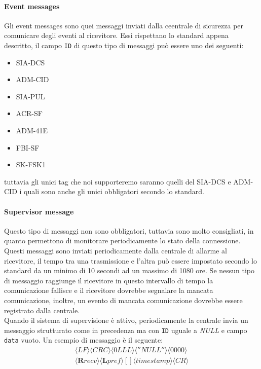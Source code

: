 \paragraph{Event messages}
Gli event messages sono quei messaggi inviati dalla ceentrale di sicurezza per comunicare degli eventi al ricevitore. Essi rispettano lo standard appena descritto, il campo \texttt{ID} di questo tipo di messaggi può essere uno dei seguenti:
\begin{itemize}
	\item SIA-DCS
	\item ADM-CID
	\item SIA-PUL
	\item ACR-SF
	\item ADM-41E
	\item FBI-SF
	\item SK-FSK1
\end{itemize}
tuttavia gli unici tag che noi supporteremo saranno quelli del SIA-DCS e ADM-CID i quali sono anche gli unici obbligatori secondo lo standard.
\paragraph{Supervisor message}
Questo tipo di messaggi non sono obbligatori, tuttavia sono molto consigliati, in quanto permettono di monitorare periodicamente lo stato della connessione. Questi messaggi sono inviati periodicamente dalla centrale di allarme al ricevitore, il tempo tra una trasmissione e l'altra può essere impostato secondo lo standard da un minimo di 10 secondi ad un massimo di 1080 ore. Se nessun tipo di messaggio raggiunge il ricevitore in questo intervallo di tempo la comunicazione fallisce e il ricevitore dovrebbe segnalare la mancata comunicazione, inoltre, un evento di mancata comunicazione dovrebbe essere registrato dalla centrale.\\
Quando il sistema di supervisione è attivo, periodicamente la centrale invia un messaggio strutturato come in precedenza ma con \texttt{ID} uguale a \emph{NULL} e campo \texttt{data} vuoto. Un esempio di messaggio è il seguente:
$$
\begin{array}{c}
\langle LF\rangle\langle CRC\rangle\langle 0LLL\rangle\langle ''NULL''\rangle\langle 0000\rangle\\\langle\textbf{R}recv\rangle\langle\textbf{L}pref\rangle
{[]}\langle timestamp\rangle \langle CR\rangle\\
\end{array}	 
$$

